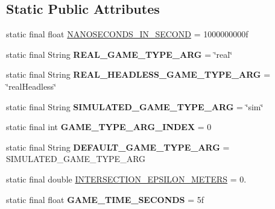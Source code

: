 \subsection*{Static Public Attributes}
\begin{DoxyCompactItemize}
\item 
static final float \hyperlink{classairhockeyjava_1_1game_1_1_constants_a4691b296cdf494bc538d12ecefbc0378}{N\+A\+N\+O\+S\+E\+C\+O\+N\+D\+S\+\_\+\+I\+N\+\_\+\+S\+E\+C\+O\+N\+D} = 1000000000f
\item 
\hypertarget{classairhockeyjava_1_1game_1_1_constants_a2bc4975a57b5d623e42d35c1e95ae4d0}{}static final String {\bfseries R\+E\+A\+L\+\_\+\+G\+A\+M\+E\+\_\+\+T\+Y\+P\+E\+\_\+\+A\+R\+G} = \char`\"{}real\char`\"{}\label{classairhockeyjava_1_1game_1_1_constants_a2bc4975a57b5d623e42d35c1e95ae4d0}

\item 
\hypertarget{classairhockeyjava_1_1game_1_1_constants_a4ef708fbba7e699ed6987ff478741c69}{}static final String {\bfseries R\+E\+A\+L\+\_\+\+H\+E\+A\+D\+L\+E\+S\+S\+\_\+\+G\+A\+M\+E\+\_\+\+T\+Y\+P\+E\+\_\+\+A\+R\+G} = \char`\"{}real\+Headless\char`\"{}\label{classairhockeyjava_1_1game_1_1_constants_a4ef708fbba7e699ed6987ff478741c69}

\item 
\hypertarget{classairhockeyjava_1_1game_1_1_constants_abaa5e58d007873c00789c35a02885a64}{}static final String {\bfseries S\+I\+M\+U\+L\+A\+T\+E\+D\+\_\+\+G\+A\+M\+E\+\_\+\+T\+Y\+P\+E\+\_\+\+A\+R\+G} = \char`\"{}sim\char`\"{}\label{classairhockeyjava_1_1game_1_1_constants_abaa5e58d007873c00789c35a02885a64}

\item 
\hypertarget{classairhockeyjava_1_1game_1_1_constants_af36c646c06f84c28bbe8bb245ba4de0f}{}static final int {\bfseries G\+A\+M\+E\+\_\+\+T\+Y\+P\+E\+\_\+\+A\+R\+G\+\_\+\+I\+N\+D\+E\+X} = 0\label{classairhockeyjava_1_1game_1_1_constants_af36c646c06f84c28bbe8bb245ba4de0f}

\item 
\hypertarget{classairhockeyjava_1_1game_1_1_constants_a51572cf32863c9fe3b3c5bbcdb7ad547}{}static final String {\bfseries D\+E\+F\+A\+U\+L\+T\+\_\+\+G\+A\+M\+E\+\_\+\+T\+Y\+P\+E\+\_\+\+A\+R\+G} = S\+I\+M\+U\+L\+A\+T\+E\+D\+\_\+\+G\+A\+M\+E\+\_\+\+T\+Y\+P\+E\+\_\+\+A\+R\+G\label{classairhockeyjava_1_1game_1_1_constants_a51572cf32863c9fe3b3c5bbcdb7ad547}

\item 
static final double \hyperlink{classairhockeyjava_1_1game_1_1_constants_a32f5539568ffa091c905ea60e1f9b084}{I\+N\+T\+E\+R\+S\+E\+C\+T\+I\+O\+N\+\_\+\+E\+P\+S\+I\+L\+O\+N\+\_\+\+M\+E\+T\+E\+R\+S} = 0.
\item 
\hypertarget{classairhockeyjava_1_1game_1_1_constants_ae817a9c0ec4d32ad08727050b09cab16}{}static final float {\bfseries G\+A\+M\+E\+\_\+\+T\+I\+M\+E\+\_\+\+S\+E\+C\+O\+N\+D\+S} = 5f\label{classairhockeyjava_1_1game_1_1_constants_ae817a9c0ec4d32ad08727050b09cab16}


\end{DoxyCompactItemize}
